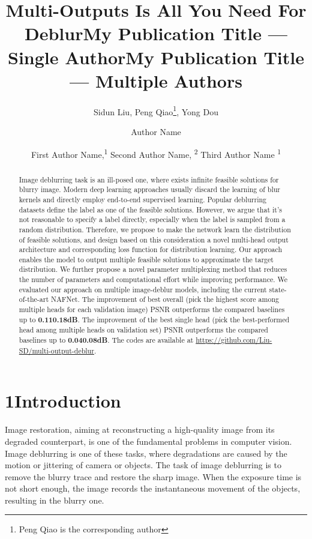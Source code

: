 \documentclass[letterpaper]{article} \usepackage{aaai23}  \usepackage{times}  \usepackage{helvet}  \usepackage{courier}  \usepackage[hyphens]{url}  \usepackage{graphicx} \urlstyle{rm} \def\UrlFont{\rm}  \usepackage{natbib}  \usepackage{caption} \frenchspacing  \setlength{\pdfpagewidth}{8.5in} \setlength{\pdfpageheight}{11in} \usepackage{algorithm}
\title{Multi-Outputs Is All You Need For Deblur}
\author{
Sidun Liu,
    Peng Qiao\footnote{Peng Qiao is the corresponding author},
    Yong Dou
}
\title{My Publication Title --- Single Author}
\author {
    Author Name
}
\title{My Publication Title --- Multiple Authors}
\author {
First Author Name,\textsuperscript{\rm 1}
    Second Author Name, \textsuperscript{\rm 2}
    Third Author Name \textsuperscript{\rm 1}
}
\begin{document}
\maketitle

\begin{abstract}
Image deblurring task is an ill-posed one, where exists infinite feasible solutions for blurry image. Modern deep learning approaches usually discard the learning of blur kernels and directly employ end-to-end supervised learning. Popular deblurring datasets define the label as one of the feasible solutions. However, we argue that it's not reasonable to specify a label directly, especially when the label is sampled from a random distribution. Therefore, we propose to make the network learn the distribution of feasible solutions, and design based on this consideration a novel multi-head output architecture and corresponding loss function for distribution learning. Our approach enables the model to output multiple feasible solutions to approximate the target distribution. We further propose a novel parameter multiplexing method that reduces the number of parameters and computational effort while improving performance. We evaluated our approach on multiple image-deblur models, including the current state-of-the-art NAFNet. The improvement of best overall (pick the highest score among multiple heads for each validation image) PSNR outperforms the compared baselines up to \textbf{0.110.18dB}. The improvement of the best single head (pick the best-performed head among multiple heads on validation set) PSNR outperforms the compared baselines up to \textbf{0.040.08dB}. The codes are available at \href{https://github.com/Liu-SD/multi-output-deblur}{https://github.com/Liu-SD/multi-output-deblur}.
\end{abstract}

\section{1\quad Introduction}

Image restoration, aiming at reconstructing a high-quality image from its degraded counterpart, is one of the fundamental problems in computer vision. Image deblurring is one of these tasks, where degradations are caused by the motion or jittering of camera or objects. The task of image deblurring is to remove the blurry trace and restore the sharp image. When the exposure time is not short enough, the image records the instantaneous movement of the objects, resulting in the blurry one. 
\end{document}
